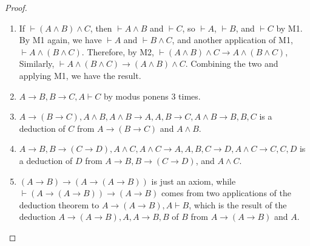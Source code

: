 \documentclass[12pt]{article}
\begin{document}
\begin{proof}
\begin{enumerate}
\item 
If $\vdash (A\land B)\land C$, then $\vdash A\land B$ and $\vdash C$, so $\vdash A$, $\vdash B$, and $\vdash C$ by M1.  By M1 again, we have $\vdash A$ and $\vdash B\land C$, and another application of M1, $\vdash A \land (B\land C)$.  Therefore, by M2, $\vdash (A\land B)\land C \to A\land (B\land C)$, Similarly, $\vdash A\land (B\land C)\to (A\land B)\land C$.  Combining the two and applying M1, we have the result.
\item
$A\to B, B\to C, A \vdash C$ by modus ponens 3 times.
\item
$A\to (B\to C), A\land B, A\land B\to A, A, B\to C, A\land B\to B, B, C$ is a deduction of $C$ from $A\to (B\to C)$ and $A\land B$.
\item
$A\to B, B\to (C\to D), A\land C, A\land C\to A, A, B, C\to D, A\land C\to C, C, D$ is a deduction of $D$ from $A\to B, B\to (C\to D)$, and $A\land C$.
\item
$(A\to B)\to (A\to (A\to B))$ is just an axiom, while $\vdash (A\to (A\to B))\to (A\to B)$ comes from two applications of the deduction theorem to $A\to (A\to B), A \vdash B$, which is the result of the deduction $A\to (A\to B), A, A\to B, B$ of $B$ from $A\to (A\to B)$ and $A$.
\end{enumerate}
\end{proof}

\end{document}
